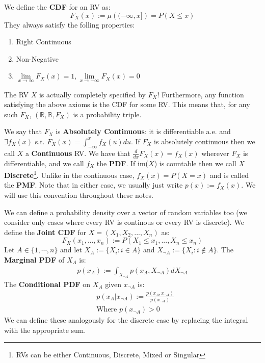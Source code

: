 \documentclass[]{article}
\theoremstyle{mattstyle}
\theoremstyle{definition}
\begin{document}
We define the \textbf{CDF} for an RV as:
$$ F_X(x) := \mu\left((-\infty,x]\right) = P(X \le x) $$
They always satisfy the folling properties:
\begin{enumerate}
	\item Right Continuous
	\item Non-Negative
	\item \(\lim\limits_{x \to \infty} F_X(x) = 1, \lim\limits_{x \to -\infty} F_X(x) = 0\)
\end{enumerate}
The RV \(X\) is actually completely specified by $F_X$! Furthermore, any function satisfying the above axioms is the CDF for some RV. This means that, for any such $F_X$, \((\mathbb{R}, \mathbb{B}, F_X)\) is a probability triple.

We say that $F_X$ is \textbf{Absolutely Continuous}: it is differentiable a.e. and $\exists f_X(x)$ s.t. $F_X(x) = \int_{-\infty}^{x} f_X(u) du$. If $F_X$ is absolutely continuous then we call \(X\) a \textbf{Continuous} RV. We have that $\frac{d}{dx}F_X(x) = f_X(x)$ wherever $F_X$ is differentiable, and we call \(f_X\) the \textbf{PDF}. If im($X$) is countable then we call \(X\) \textbf{Discrete}\footnote{RVs can be either Continuous, Discrete, Mixed or Singular}. Unlike in the continuous case, \(f_X(x)=P(X=x)\) and is called the \textbf{PMF}. Note that in either case, we usually just write $p(x):=f_{X}(x)$. We will use this convention throughout these notes.

We can define a probability density over a vector of random variables too (we consider only cases where every RV is continous or every RV is discrete). We define the \textbf{Joint CDF} for \( X = (X_1, X_2, ..., X_n)\) as: 
$$F_X(x_1,...,x_n) := P(X_1 \le x_1, ..., X_n \le x_n)$$
Let $A\in\{1,\cdots, n\}$ and let $X_A := \{X_i: i \in A\}$ and $X_{\neg A} := \{X_i: i \not\in A\}$. The \textbf{Marginal PDF} of \(X_A\) is:
	\begin{align*}
	p(x_A) := \int_{X_{\neg A}}p\left(x_A, X_{\neg A}\right)dX_{\neg A}
	\end{align*}
The \textbf{Conditional PDF} on \(X_{A}\) given \(x_{\neg A}\) is:
	\begin{align*}
	&p\left(x_A|x_{\neg A}\right) :=\frac{p\left(x_A, x_{\neg A}\right)}{p(x_{\neg A})}\\
	&\text{Where $p(x_{\neg A}) > 0$}
	\end{align*}
We can define these analogously for the discrete case by replacing the integral with the appropriate sum.

\newpage
\end{document}
